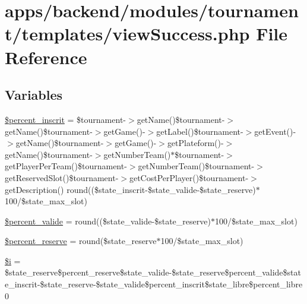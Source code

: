 \hypertarget{backend_2modules_2tournament_2templates_2view_success_8php}{\section{apps/backend/modules/tournament/templates/view\-Success.php File Reference}
\label{backend_2modules_2tournament_2templates_2view_success_8php}
}
\subsection*{Variables}
\begin{DoxyCompactItemize}
\item 
\hyperlink{backend_2modules_2tournament_2templates_2view_success_8php_ac03c20507069eb4aa471480a173f33ba}{\$percent\-\_\-inscrit} = \$tournament-\/$>$get\-Name()\$tournament-\/$>$get\-Name()\$tournament-\/$>$get\-Game()-\/$>$get\-Label()\$tournament-\/$>$get\-Event()-\/$>$get\-Name()\$tournament-\/$>$get\-Game()-\/$>$get\-Plateform()-\/$>$get\-Name()\$tournament-\/$>$get\-Number\-Team()$\ast$\$tournament-\/$>$get\-Player\-Per\-Team()\$tournament-\/$>$get\-Number\-Team()\$tournament-\/$>$get\-Reserved\-Slot()\$tournament-\/$>$get\-Cost\-Per\-Player()\$tournament-\/$>$get\-Description() round((\$state\-\_\-inscrit-\/\$state\-\_\-valide-\/\$state\-\_\-reserve)$\ast$100/\$state\-\_\-max\-\_\-slot)
\item 
\hyperlink{backend_2modules_2tournament_2templates_2view_success_8php_aa49d95103fa982ed10c0bca6032b59a9}{\$percent\-\_\-valide} = round((\$state\-\_\-valide-\/\$state\-\_\-reserve)$\ast$100/\$state\-\_\-max\-\_\-slot)
\item 
\hyperlink{backend_2modules_2tournament_2templates_2view_success_8php_a23da4a29d9c1250ffead2a95108677d3}{\$percent\-\_\-reserve} = round(\$state\-\_\-reserve$\ast$100/\$state\-\_\-max\-\_\-slot)
\item 
\hyperlink{backend_2modules_2tournament_2templates_2view_success_8php_a83018d9153d17d91fbcf3bc10158d34f}{\$i} = \$state\-\_\-reserve\$percent\-\_\-reserve\$state\-\_\-valide-\/\$state\-\_\-reserve\$percent\-\_\-valide\$state\-\_\-inscrit-\/\$state\-\_\-reserve-\/\$state\-\_\-valide\$percent\-\_\-inscrit\$state\-\_\-libre\$percent\-\_\-libre0
\end{DoxyCompactItemize}


